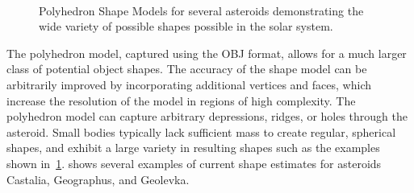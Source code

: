 \begin{figure}
    \centering
    ~

    \caption{Polyhedron Shape Models for several asteroids demonstrating the wide variety of possible shapes possible in the solar system.~\label{fig:asteroid_shape}}
\end{figure}
The polyhedron model, captured using the OBJ format, allows for a much larger class of potential object shapes. 
The accuracy of the shape model can be arbitrarily improved by incorporating additional vertices and faces, which increase the resolution of the model in regions of high complexity.
The polyhedron model can capture arbitrary depressions, ridges, or holes through the asteroid.
Small bodies typically lack sufficient mass to create regular, spherical shapes, and exhibit a large variety in resulting shapes such as the examples shown in~\cref{fig:asteroid_shape}.
 shows several examples of current shape estimates for asteroids Castalia, Geographus, and Geolevka.


